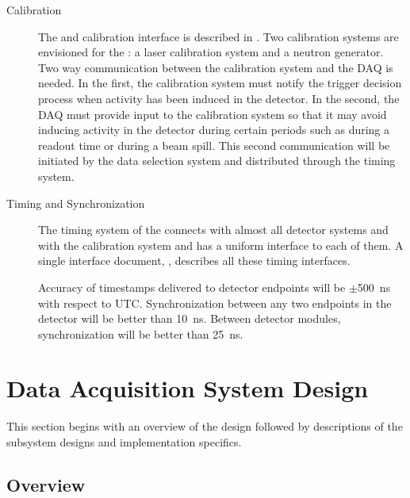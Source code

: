 \begin{description}
\item[Calibration] The  and calibration interface is described in . Two calibration systems are envisioned for the : a laser calibration system and a neutron generator. 
  Two way communication between the calibration system and the DAQ is needed.  In the first, the calibration system must notify the trigger decision process when activity has been induced in the detector.  In the second, the DAQ must provide input to the calibration system so that it may avoid inducing activity in the detector during certain periods such as during a  readout time or during a beam spill.
This second communication will be initiated by the data selection system and distributed through the
 timing system.


\item[Timing and Synchronization] The timing system of the   connects with almost all detector systems and with the calibration system and has a uniform interface to each of them. 
  A single interface document, , describes all these timing interfaces. 

Accuracy of timestamps delivered to  detector endpoints will be $\pm$\SI{500}{\nano\second} with respect to UTC. Synchronization between any two endpoints in the detector will be better than \SI{10}{\nano\second}. Between detector modules, synchronization will be better than \SI{25}{\nano\second}.  
\end{description}

\section{Data Acquisition System Design}
\label{sec:fd-daq:design}

This section begins with an overview of the 
design followed by
descriptions of the subsystem designs and implementation specifics.

\subsection{Overview}
\label{sec:fd-daq:design-overview}


